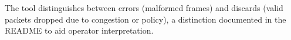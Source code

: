 \documentclass[preprint]{elsarticle}
\begin{document}
The tool distinguishes between errors (malformed frames) and discards (valid packets dropped due to congestion or policy), a distinction documented in the README to aid operator interpretation. 


%
%
%
%
%
%
%
%
%
\end{document}
